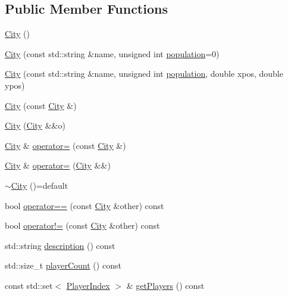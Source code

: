 \subsection*{Public Member Functions}
\begin{DoxyCompactItemize}
\item 
\hyperlink{classpan_1_1_city_abf8a8407beecfc243044a6928960dc25}{City} ()
\item 
\hyperlink{classpan_1_1_city_a0a167d009ec26423e3f64a952e6f5835}{City} (const std\+::string \&name, unsigned int \hyperlink{classpan_1_1_city_aedd352c6f6ecaf1c78184189cef035b7}{population}=0)
\item 
\hyperlink{classpan_1_1_city_ae007f3169e698aa000bd8d20de1e278b}{City} (const std\+::string \&name, unsigned int \hyperlink{classpan_1_1_city_aedd352c6f6ecaf1c78184189cef035b7}{population}, double xpos, double ypos)
\item 
\hyperlink{classpan_1_1_city_ae7eeaa8d62dc361a7ad7be657cc41e69}{City} (const \hyperlink{classpan_1_1_city}{City} \&)
\item 
\hyperlink{classpan_1_1_city_a77b79e8d2ae5e9fa6ae37d290c87df2f}{City} (\hyperlink{classpan_1_1_city}{City} \&\&o)
\item 
\hyperlink{classpan_1_1_city}{City} \& \hyperlink{classpan_1_1_city_af289409b1c1d687cc74b163dd15b4133}{operator=} (const \hyperlink{classpan_1_1_city}{City} \&)
\item 
\hyperlink{classpan_1_1_city}{City} \& \hyperlink{classpan_1_1_city_a10109e483fc579bca4124135a238a7e3}{operator=} (\hyperlink{classpan_1_1_city}{City} \&\&)
\item 
\hyperlink{classpan_1_1_city_a5cec0ac09c157ca262c61a1fbb7debf3}{$\sim$\+City} ()=default
\item 
bool \hyperlink{classpan_1_1_city_ac43e794b9736734744c81d28387a4d26}{operator==} (const \hyperlink{classpan_1_1_city}{City} \&other) const
\item 
bool \hyperlink{classpan_1_1_city_a5fefdda50088576ad882402a266fded8}{operator!=} (const \hyperlink{classpan_1_1_city}{City} \&other) const
\item 
std\+::string \hyperlink{classpan_1_1_city_a0232df988764b10f50570e335e8237c2}{description} () const
\item 
std\+::size\+\_\+t \hyperlink{classpan_1_1_city_a0267d8dd3cc41d23ceabe4a6a8172df5}{player\+Count} () const
\item 
const std\+::set$<$ \hyperlink{namespacepan_a0cdabf874fbf1bb3a1f0152d108c2909}{Player\+Index} $>$ \& \hyperlink{classpan_1_1_city_af141a83daaa0521bbad892ba9c7fd6c3}{get\+Players} () const

\end{DoxyCompactItemize}
